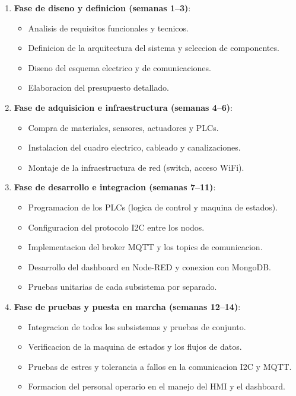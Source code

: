 \begin{enumerate}
    \item \textbf{Fase de diseno y definicion (semanas 1--3)}:
    \begin{itemize}
        \item Analisis de requisitos funcionales y tecnicos.
        \item Definicion de la arquitectura del sistema y seleccion de componentes.
        \item Diseno del esquema electrico y de comunicaciones.
        \item Elaboracion del presupuesto detallado.
    \end{itemize}
    \item \textbf{Fase de adquisicion e infraestructura (semanas 4--6)}:
    \begin{itemize}
        \item Compra de materiales, sensores, actuadores y PLCs.
        \item Instalacion del cuadro electrico, cableado y canalizaciones.
        \item Montaje de la infraestructura de red (switch, acceso WiFi).
    \end{itemize}
    \item \textbf{Fase de desarrollo e integracion (semanas 7--11)}:
    \begin{itemize}
        \item Programacion de los PLCs (logica de control y maquina de estados).
        \item Configuracion del protocolo I2C entre los nodos.
        \item Implementacion del broker MQTT y los topics de comunicacion.
        \item Desarrollo del dashboard en Node-RED y conexion con MongoDB.
        \item Pruebas unitarias de cada subsistema por separado.
    \end{itemize}
    \item \textbf{Fase de pruebas y puesta en marcha (semanas 12--14)}:
    \begin{itemize}
        \item Integracion de todos los subsistemas y pruebas de conjunto.
        \item Verificacion de la maquina de estados y los flujos de datos.
        \item Pruebas de estres y tolerancia a fallos en la comunicacion I2C y MQTT.
        \item Formacion del personal operario en el manejo del HMI y el dashboard.

\end{itemize}
\end{enumerate}
